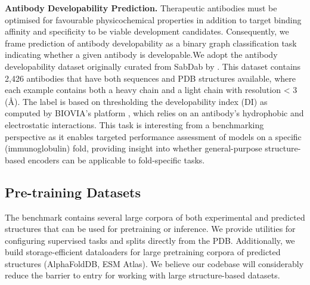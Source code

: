 \textbf{Antibody Developability Prediction. }
Therapeutic antibodies must be optimised for favourable physicochemical properties in addition to target binding affinity and specificity to be viable development candidates. Consequently, we frame prediction of antibody developability as a binary graph classification task indicating whether a given antibody is developable.We adopt the antibody developability dataset originally curated from SabDab \citep{dunbar2014sabdab} by \citet{Chen2020}.
This dataset contains 2,426 antibodies that have both sequences and PDB structures available, where each example contains both a heavy chain and a light chain with resolution < 3 (\AA). 
The label is based on thresholding the developability index (DI) \citep{Lauer2012} 
as computed by BIOVIA's platform \citep{Accelrys2018BioviaDiscoveryStudio}, which relies on an antibody's hydrophobic and electrostatic interactions.
This task is interesting from a benchmarking perspective as it enables targeted performance assessment of models on a specific (immunoglobulin) fold, providing insight into whether general-purpose structure-based encoders can be applicable to fold-specific tasks.

\subsection{Pre-training Datasets}\label{sec:pre-train-data}

The benchmark contains several large corpora of both experimental and predicted structures that can be used for pretraining or inference. We provide utilities for configuring supervised tasks and splits directly from the PDB.
Additionally, we build storage-efficient dataloaders for large pretraining corpora of predicted structures (AlphaFoldDB, ESM Atlas).
We believe our codebase will considerably reduce the barrier to entry for working with large structure-based datasets. 


